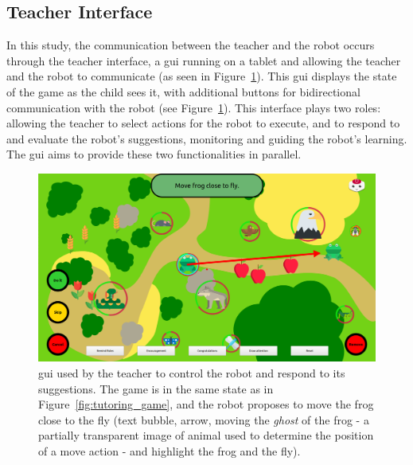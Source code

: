 \subsection{Teacher Interface} \label{sec:tuto_woz}

In this study, the communication between the teacher and the robot occurs through the teacher interface, a \gls{gui} running on a tablet and allowing the teacher and the robot to communicate (as seen in Figure~\ref{fig:tutoring_gui}). This \gls{gui} displays the state of the game as the child sees it, with additional buttons for bidirectional communication with the robot (see Figure~\ref{fig:tutoring_gui}). This interface plays two roles: allowing the teacher to select actions for the robot to execute, and to respond to and evaluate the robot's suggestions, monitoring and guiding the robot's learning. The \gls{gui} aims to provide these two functionalities in parallel.

\begin{figure}[ht]
	\centering
	\includegraphics[width=1\textwidth]{gui.png}
	\caption{\gls{gui} used by the teacher to control the robot and respond to its suggestions. The game is in the same state as in Figure~\ref{fig:tutoring_game}, and the robot proposes to move the frog close to the fly (text bubble, arrow, moving the \textit{ghost} of the frog - a partially transparent image of animal used to determine the position of a move action - and highlight the frog and the fly).}
	\label{fig:tutoring_gui}
\end{figure}

